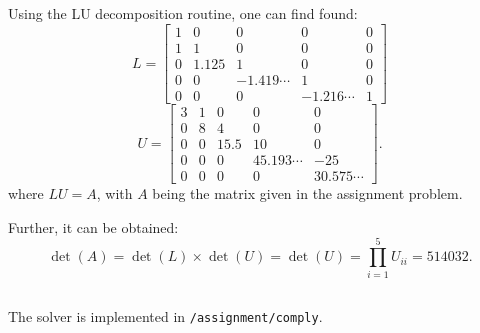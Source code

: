 \documentclass[12pt, a4paper]{article}
\begin{document}
  \subsection{}
  Using the LU decomposition routine, one can find found:
  \begin{equation}
    L = \begin{bmatrix}1 & 0 & 0 & 0 & 0 \\ 1 & 1 & 0 & 0 & 0 \\ 0 & 1.125 & 1 & 0 & 0 \\ 0 & 0 & -1.419\cdots & 1 & 0 \\ 0 & 0 & 0 & -1.216\cdots & 1\end{bmatrix}
  \end{equation}
  \begin{equation}
    U = \begin{bmatrix}3 & 1 & 0 & 0 & 0 \\ 0 & 8 & 4 & 0 & 0 \\ 0 & 0 & 15.5 & 10 & 0 \\ 0 & 0 & 0 & 45.193\cdots & -25 \\ 0 & 0 & 0 & 0 & 30.575\cdots\end{bmatrix}.
  \end{equation}
  where $LU = A$, with $A$ being the matrix given in the assignment problem.

  Further, it can be obtained:
  \begin{equation}
    \det(A) = \det(L) \times \det(U) = \det(U) = \prod_{i=1}^5 U_{ii} = 514032.
  \end{equation}

  \subsection{}
  The solver is implemented in \texttt{/assignment/comply}.
\end{document}
